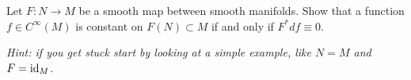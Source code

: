 \begin{exercise}
  Let $F:N\to M$ be a smooth map between smooth manifolds.
  Show that a function $f\in C^\infty(M)$ is constant on $F(N)\subset M$ if and only if $F^* df \equiv 0$.

  \textit{\small Hint: if you get stuck start by looking at a simple example, like $N=M$ and $F=\operatorname{id}_M$.}
\end{exercise}
